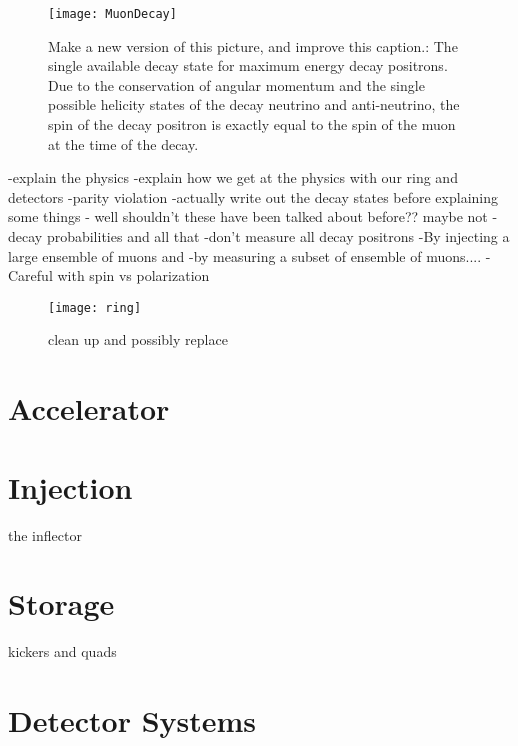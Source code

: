 \begin{figure}[]
	\centering
	\texttt{[image: MuonDecay]}
    \caption[Muon Decay - Max Energy Positron]{Make a new version of this picture, and improve this caption.: The single available decay state for maximum energy decay positrons. Due to the conservation of angular momentum and the single possible helicity states of the decay neutrino and anti-neutrino, the spin of the decay positron is exactly equal to the spin of the muon at the time of the decay.}
    \label{fig:MuonDecay}
\end{figure}


-explain the physics
-explain how we get at the physics with our ring and detectors
-parity violation
-actually write out the decay states before explaining some things - well shouldn't these have been talked about before?? maybe not
-decay probabilities and all that
-don't measure all decay positrons
-By injecting a large ensemble of muons and 
-by measuring a subset of ensemble of muons....
-Careful with spin vs polarization





\begin{figure}[]
    \centering
    \texttt{[image: ring]}
    \caption[ring]{clean up and possibly replace}   
    \label{fig:ring}
\end{figure}


\section{Accelerator}
\label{sec:Accelerator}




\cite{Stratakis:2017uci}


\section{Injection}
\label{sec:Injection}

the inflector



\section{Storage}
\label{sec:Storage}

kickers and quads





\section{Detector Systems}
\label{sec:DetectorSystems}

